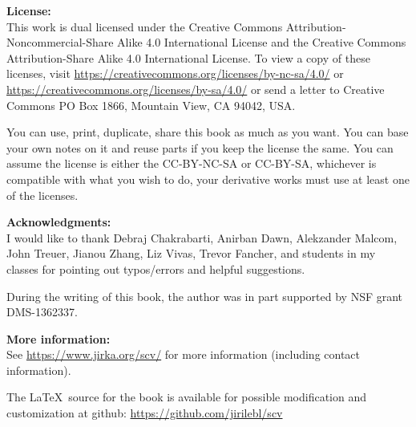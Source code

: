 \documentclass[12pt,openany]{book}
\theoremstyle{plain}
\theoremstyle{remark}
\theoremstyle{definition}
\theoremstyle{exercise}
\theoremstyle{example}
\begin{document}
\bigskip

\noindent
\textbf{License:}
\\
This work is dual licensed under
the Creative Commons
Attribution-Non\-commercial-Share Alike 4.0 International License and
the Creative Commons
Attribution-Share Alike 4.0 International License.
To view a
copy of these licenses, visit
\url{https://creativecommons.org/licenses/by-nc-sa/4.0/}
or
\url{https://creativecommons.org/licenses/by-sa/4.0/}
or send a letter to
Creative Commons
PO Box 1866, Mountain View, CA 94042, USA\@.

\bigskip

\noindent
You can use, print, duplicate, share this book as much as you want.  You can
base your own notes on it and reuse parts if you keep the license the
same.  You can assume the license is either the CC-BY-NC-SA or CC-BY-SA\@,
whichever is compatible with what you wish to do, your derivative works must
use at least one of the licenses.

\bigskip

\noindent
\textbf{Acknowledgments:}
\\
I would like to thank Debraj Chakrabarti, Anirban Dawn, Alekzander Malcom,
John Treuer, Jianou Zhang, Liz Vivas, Trevor Fancher,
and students in my classes for pointing out typos/errors
and helpful suggestions. 

\bigskip

\noindent
During the writing of this book, 
the author was in part supported by NSF grant DMS-1362337.

\bigskip

\noindent
\textbf{More information:}
\\
See \url{https://www.jirka.org/scv/} for more information
(including contact information).

\medskip

\noindent
The \LaTeX\ source for the book is available
for possible modification and customization
at github: \url{https://github.com/jirilebl/scv}



\tableofcontents
{}

\end{document}
